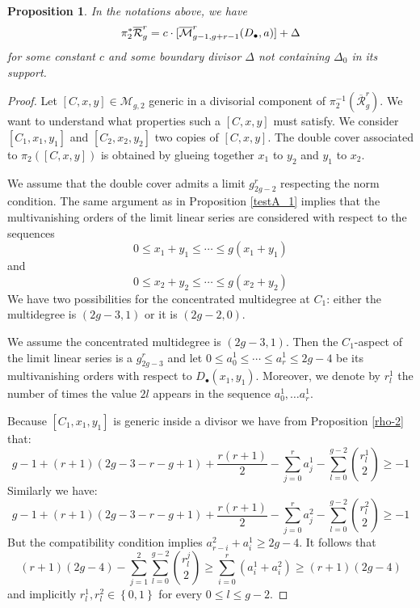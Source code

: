 \documentclass{article}
\theoremstyle{plain}
\newtheorem{prop}[trm]{Proposition}
\theoremstyle{definition}
\def\cM{\mathcal{M}}
\def\rr{\overline{\mathcal{R}}}
\def\mm{\overline{\mathcal{M}}}
\begin{document}
\begin{prop} \label{sBNpull} \normalfont In the notations above, we have 
	\[\pi_2^*\rr^r_g =  c\cdot[\mm^r_{g-1, g+r-1}\text{\large (}D_{\bullet}, \textbf{a}\text{\large )}] + \Delta \] 
	for some constant $c$ and some boundary divisor $\Delta$ not containing $\Delta_0$ in its support. 
\end{prop}
\begin{proof}
	Let $[C,x,y] \in \cM_{g,2}$ generic in a divisorial component of $\pi_2^{-1}(\rr^r_g)$. We want to understand what properties such a $[C,x,y]$ must satisfy. We consider $[C_1, x_1, y_1]$ and $[C_2, x_2, y_2]$ two copies of $[C,x,y]$. The double cover associated to $\pi_2([C,x,y])$ is obtained by glueing together $x_1$ to $y_2$ and $y_1$ to $x_2$.
	
	We assume that the double cover admits a limit $g^r_{2g-2}$ respecting the norm condition. The same argument as in Proposition \ref{testA_1} implies that the multivanishing orders of the limit linear series are considered with respect to the sequences 
	\[ 0 \leq x_1+y_1\leq \cdots \leq g(x_1+y_1)\]
	and 
		\[ 0 \leq x_2+y_2\leq \cdots \leq g(x_2+y_2)\]
	We have two possibilities for the concentrated multidegree at $C_1$: either the multidegree is $(2g-3,1)$ or it is $(2g-2,0)$. 
	
	We assume the concentrated multidegree is $(2g-3,1)$. Then the $C_1$-aspect of the limit linear series is a $g^r_{2g-3}$ and let $0\leq a^1_0 \leq \cdots \leq a^1_r \leq 2g-4$ be its multivanishing orders with respect to $D_\bullet(x_1,y_1)$. Moreover, we denote by $r^1_l$ the number of times the value $2l$ appears in the sequence $a^1_0, \ldots a^1_r$. 
	
	Because $[C_1,x_1,y_1]$ is generic inside a divisor we have from Proposition \ref{rho-2} that: 
	\[ g-1 +(r+1)(2g-3-r-g+1) + \frac{r(r+1)}{2} -\sum_{j=0}^{r}a^1_j - \sum_{l=0}^{g-2} \binom{r^1_l}{2} \geq -1 \]
	Similarly we have: 
	\[ g-1 +(r+1)(2g-3-r-g+1) + \frac{r(r+1)}{2} -\sum_{j=0}^{r}a^2_j - \sum_{l=0}^{g-2} \binom{r^2_l}{2} \geq -1 \]
	But the compatibility condition implies $a^2_{r-i} + a^1_i \geq 2g-4$. It follows that 
	\[ (r+1)(2g-4) - \sum_{j=1}^{2}\sum_{l=0}^{g-2}\binom{r^j_l}{2} \geq \sum_{i=0}^{r}(a^1_i+a^2_i) \geq (r+1)(2g-4)\]
	and implicitly $r^1_l, r^2_l \in \left\{0,1\right\}$ for every $0\leq l\leq g-2$.
	

\end{proof}
\end{document}
